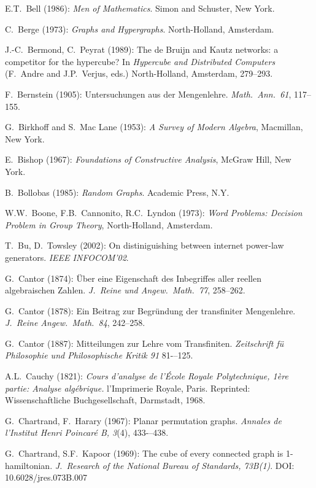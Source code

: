 \begin{thebibliography}{999}
E.T.~Bell (1986):
{\it Men of Mathematics}.
Simon and Schuster, New York.

C.~Berge (1973):
{\it Graphs and Hypergraphs}.
North-Holland, Amsterdam.

J.-C.~Bermond, C.~Peyrat (1989):
The de Bruijn and Kautz networks: a competitor for the hypercube?
In {\it Hypercube and Distributed Computers} (F.~Andre and
J.P.~Verjus, eds.)  North-Holland, Amsterdam, 279--293.

F.~Bernstein (1905): Untersuchungen aus der Mengenlehre. {\it
Math.~Ann.~61}, 117--155.

G.~Birkhoff and S.~Mac Lane (1953): {\it A Survey of Modern Algebra},
Macmillan, New York.

E.~Bishop (1967): {\it Foundations of Constructive Analysis},
McGraw Hill, New York.

B.~Bollobas (1985):
{\it Random Graphs}.
Academic Press, N.Y.

W.W.~Boone, F.B.~Cannonito, R.C.~Lyndon (1973):
{\it Word Problems: Decision Problem in Group Theory}, North-Holland,
Amsterdam.

T.~Bu, D.~Towsley (2002):
On distiniguishing between internet power-law generators.
{\it IEEE INFOCOM'02}.


G.~Cantor (1874): \"{U}ber eine Eigenschaft des Inbegriffes aller
reellen algebraischen Zahlen.  {\it J.~Reine und Angew.~Math.~77},
258--262.

G.~Cantor (1878): Ein Beitrag zur Begr\"{u}ndung der transfiniter
Mengenlehre.  {\it J.~Reine Angew.~Math.~84}, 242--258.

G.~Cantor (1887): Mitteilungen zur Lehre vom Transfiniten.
{\it Zeitschrift f\"{u} Philosophie und Philosophische Kritik 91}
81-–125.

A.L.~Cauchy (1821): {\it Cours d'analyse de l'\'{E}cole Royale
Polytechnique, 1\`{e}re partie: Analyse alg\'{e}brique.}
l'Imprimerie Royale, Paris.  Reprinted: Wissenschaftliche
Buchgesellschaft, Darmstadt, 1968.

G.~Chartrand, F.~Harary (1967):
Planar permutation graphs.
{\it Annales de l'Institut Henri Poincar\'{e} B, 3}(4), 433-–438.

G.~Chartrand, S.F.~Kapoor (1969):
The cube of every connected graph is 1-hamiltonian.
{\it J.~Research of the National Bureau of Standards, 73B(1)}.  DOI:
10.6028/jres.073B.007


\end{thebibliography}
